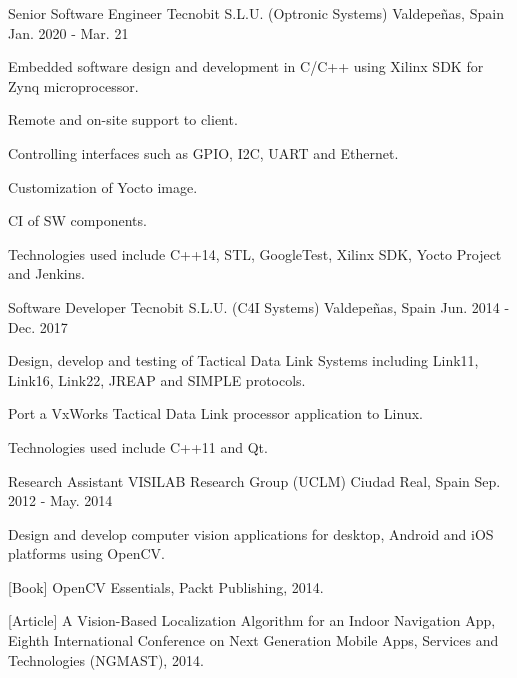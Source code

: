 \begin{cventries}
  \cventry
    {Senior Software Engineer} %
    {Tecnobit S.L.U. (Optronic Systems)} %
    {Valdepeñas, Spain} %
    {Jan. 2020 - Mar. 21} %
    {
      \begin{cvitems} %
        \item {Embedded software design and development in C/C++ using Xilinx SDK for Zynq microprocessor.}
        \item {Remote and on-site support to client.}
        \item {Controlling interfaces such as GPIO, I2C, UART and Ethernet.}
        \item {Customization of Yocto image.}
        \item {CI of SW components.}
        \item {Technologies used include C++14, STL, GoogleTest, Xilinx SDK, Yocto Project and Jenkins.}
      \end{cvitems}
    }

  \cventry
    {Software Developer} %
    {Tecnobit S.L.U. (C4I Systems)} %
    {Valdepeñas, Spain} %
    {Jun. 2014 - Dec. 2017} %
    {
      \begin{cvitems} %
        \item {Design, develop and testing of Tactical Data Link Systems including Link11, Link16, Link22, JREAP and SIMPLE protocols.}
        \item {Port a VxWorks Tactical Data Link processor application to Linux.}
        \item {Technologies used include C++11 and Qt.}
      \end{cvitems}
    }


  \cventry
    {Research Assistant} %
    {VISILAB Research Group (UCLM)} %
    {Ciudad Real, Spain} %
    {Sep. 2012 - May. 2014} %
    {
      \begin{cvitems} %
        \item {Design and develop computer vision applications for desktop, Android and iOS platforms using OpenCV.}
        \item {[Book] OpenCV Essentials, Packt Publishing, 2014.}
        \item {[Article] A Vision-Based Localization Algorithm for an Indoor Navigation App, Eighth International Conference on Next Generation Mobile Apps, Services and Technologies (NGMAST), 2014.}
      \end{cvitems}
    }




\end{cventries}
